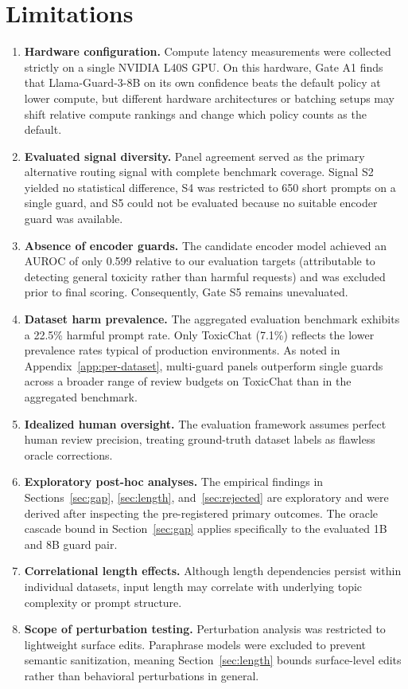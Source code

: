 \documentclass[11pt]{article}
\begin{document}
\section{Limitations}

\begin{enumerate}
  \item \textbf{Hardware configuration.} Compute latency measurements were collected strictly on a single NVIDIA L40S GPU. On this hardware, Gate A1 finds that Llama-Guard-3-8B on its own confidence beats the default policy at lower compute, but different hardware architectures or batching setups may shift relative compute rankings and change which policy counts as the default.
  \item \textbf{Evaluated signal diversity.} Panel agreement served as the primary alternative routing signal with complete benchmark coverage. Signal S2 yielded no statistical difference, S4 was restricted to 650 short prompts on a single guard, and S5 could not be evaluated because no suitable encoder guard was available.
  \item \textbf{Absence of encoder guards.} The candidate encoder model achieved an AUROC of only 0.599 relative to our evaluation targets (attributable to detecting general toxicity rather than harmful requests) and was excluded prior to final scoring. Consequently, Gate S5 remains unevaluated.
  \item \textbf{Dataset harm prevalence.} The aggregated evaluation benchmark exhibits a 22.5\% harmful prompt rate. Only ToxicChat (7.1\%) reflects the lower prevalence rates typical of production environments. As noted in Appendix~\ref{app:per-dataset}, multi-guard panels outperform single guards across a broader range of review budgets on ToxicChat than in the aggregated benchmark.
  \item \textbf{Idealized human oversight.} The evaluation framework assumes perfect human review precision, treating ground-truth dataset labels as flawless oracle corrections.
  \item \textbf{Exploratory post-hoc analyses.} The empirical findings in Sections~\ref{sec:gap}, \ref{sec:length}, and~\ref{sec:rejected} are exploratory and were derived after inspecting the pre-registered primary outcomes. The oracle cascade bound in Section~\ref{sec:gap} applies specifically to the evaluated 1B and 8B guard pair.
  \item \textbf{Correlational length effects.} Although length dependencies persist within individual datasets, input length may correlate with underlying topic complexity or prompt structure.
  \item \textbf{Scope of perturbation testing.} Perturbation analysis was restricted to lightweight surface edits. Paraphrase models were excluded to prevent semantic sanitization, meaning Section~\ref{sec:length} bounds surface-level edits rather than behavioral perturbations in general.
\end{enumerate}
\end{document}
